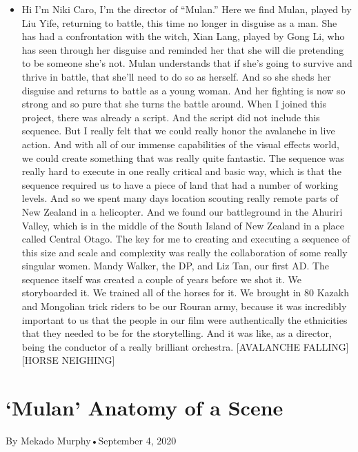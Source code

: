 \begin{itemize}
\tightlist
\item
  Hi I'm Niki Caro, I'm the director of ``Mulan.'' Here we find Mulan,
  played by Liu Yife, returning to battle, this time no longer in
  disguise as a man. She has had a confrontation with the witch, Xian
  Lang, played by Gong Li, who has seen through her disguise and
  reminded her that she will die pretending to be someone she's not.
  Mulan understands that if she's going to survive and thrive in battle,
  that she'll need to do so as herself. And so she sheds her disguise
  and returns to battle as a young woman. And her fighting is now so
  strong and so pure that she turns the battle around. When I joined
  this project, there was already a script. And the script did not
  include this sequence. But I really felt that we could really honor
  the avalanche in live action. And with all of our immense capabilities
  of the visual effects world, we could create something that was really
  quite fantastic. The sequence was really hard to execute in one really
  critical and basic way, which is that the sequence required us to have
  a piece of land that had a number of working levels. And so we spent
  many days location scouting really remote parts of New Zealand in a
  helicopter. And we found our battleground in the Ahuriri Valley, which
  is in the middle of the South Island of New Zealand in a place called
  Central Otago. The key for me to creating and executing a sequence of
  this size and scale and complexity was really the collaboration of
  some really singular women. Mandy Walker, the DP, and Liz Tan, our
  first AD. The sequence itself was created a couple of years before we
  shot it. We storyboarded it. We trained all of the horses for it. We
  brought in 80 Kazakh and Mongolian trick riders to be our Rouran army,
  because it was incredibly important to us that the people in our film
  were authentically the ethnicities that they needed to be for the
  storytelling. And it was like, as a director, being the conductor of a
  really brilliant orchestra. {[}AVALANCHE FALLING{]} {[}HORSE
  NEIGHING{]}
\end{itemize}

\hypertarget{mulan--anatomy-of-a-scene-1}{%
\section{`Mulan' \textbar{} Anatomy of a
Scene}\label{mulan--anatomy-of-a-scene-1}}

By Mekado Murphy•September 4, 2020


